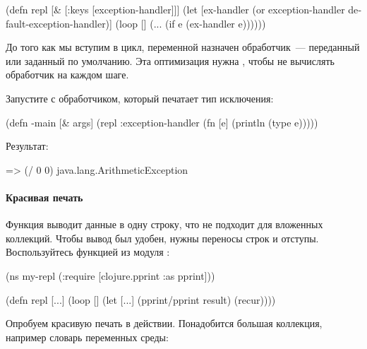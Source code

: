 \begin{english}
  \begin{clojure}
(defn repl [& [{:keys [exception-handler]}]]
  (let [ex-handler
        (or exception-handler
            default-exception-handler)]
    (loop []
      (...
        (if e
          (ex-handler e))))))
  \end{clojure}
\end{english}

До того как мы вступим в цикл, переменной  назначен обработчик~--- переданный или заданный по умолчанию. Эта оптимизация нужна , чтобы не вычислять обработчик на каждом шаге.

Запустите  с обработчиком, который печатает тип исключения:

\begin{english}
  \begin{clojure}
(defn -main [& args]
  (repl {:exception-handler
         (fn [e] (println (type e)))}))
  \end{clojure}
\end{english}

Результат:

\begin{english}
  \begin{clojure}
=> (/ 0 0)
java.lang.ArithmeticException
  \end{clojure}
\end{english}

\paragraph{Красивая печать}

Функция  выводит данные в одну строку, что не подходит для вложенных коллекций. Чтобы вывод был удобен, нужны переносы строк и отступы. Воспользуйтесь функцией  из модуля :

\begin{english}
  \begin{clojure}
(ns my-repl
  (:require
   [clojure.pprint :as pprint]))

(defn repl [...]
  (loop []
    (let [...]
      (pprint/pprint result)
      (recur))))
  \end{clojure}
\end{english}

Опробуем красивую печать в действии. Понадобится большая коллекция, например словарь переменных среды:

